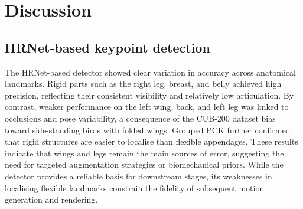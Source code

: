 \documentclass[final-report]{report-template}
\begin{document}
\begin{table}[h!]
\centering
{}
\caption{Mean Opinion Score (MOS) results across four evaluation tasks. Scores are averaged over 18 raters. For Task A Condition, \textit{E = Edge scale, D = Depth scale, P = Pose scale}.}
\label{table}
\end{table}

\newpage
\section{Discussion}

\subsection{HRNet-based keypoint detection}
The HRNet-based detector showed clear variation in accuracy across anatomical landmarks. 
Rigid parts such as the right leg, breast, and belly achieved high precision, reflecting their consistent visibility and relatively low articulation. 
By contrast, weaker performance on the left wing, back, and left leg was linked to occlusions and pose variability, a consequence of the CUB-200 dataset bias toward side-standing birds with folded wings.  
Grouped PCK further confirmed that rigid structures are easier to localise than flexible appendages. 
These results indicate that wings and legs remain the main sources of error, suggesting the need for targeted augmentation strategies or biomechanical priors.  
While the detector provides a reliable basis for downstream stages, its weaknesses in localising flexible landmarks constrain the fidelity of subsequent motion generation and rendering.
\end{document}
